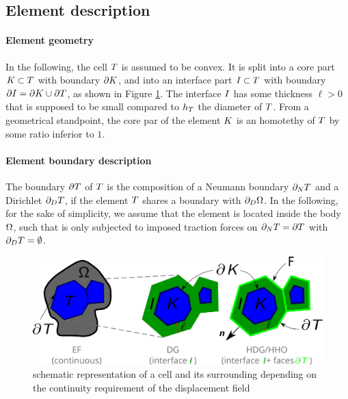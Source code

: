 \subsection{Element description}

\paragraph{Element geometry}

In the following, the cell $T$ is assumed to be convex.
It is split into a core part $K \subset T$ with boundary $\partial K$, and into an interface part $I{} \subset T$ with boundary $\partial I = \partial K \cup \partial T$, as shown in Figure \ref{fig_02}. The interface $I{}$ has some thickness $\ell > 0$ that is supposed to be small compared to $h_{T}$ the diameter of $T$.
From a geometrical standpoint, the core par of the element $K{}$ is an homotethy of $T$ by some ratio inferior to $1$.

\paragraph{Element boundary description} The boundary $\partial T{}$ of $T$ is the composition of a Neumann boundary $\partial_N T{}$ and a Dirichlet $\partial_D T{}$, if the element $T$ shares a boundary with $\partial_D \Omega{}$. In the following, for the sake of simplicity, we assume that the element is located inside the body $\Omega{}$, such that is only subjected to imposed traction forces on $\partial_N T{} = \partial T{}$ with $\partial_D T{} = \emptyset$.
%
% 
% 
\begin{figure}[H]
    \centering
    \includegraphics[width=14.cm]{img_calcs/ef_dg_hdg.png}
    \caption{schematic representation of a cell and its surrounding depending on the continuity requirement of the displacement field}
    \label{fig_02}
\end{figure}
%
%
%

